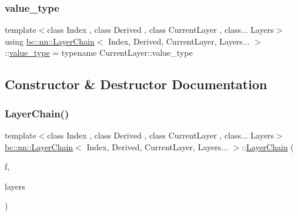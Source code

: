 \subsubsection{\texorpdfstring{value\+\_\+type}{value\_type}}
{\footnotesize\ttfamily template$<$class Index , class Derived , class Current\+Layer , class... Layers$>$ \\
using \hyperlink{structbc_1_1nn_1_1LayerChain}{bc\+::nn\+::\+Layer\+Chain}$<$ Index, Derived, Current\+Layer, Layers... $>$\+::\hyperlink{structbc_1_1nn_1_1LayerChain_3_01Index_00_01Derived_00_01CurrentLayer_00_01Layers_8_8_8_01_4_adbaa11a40f5d5c6c737b4f61cfd4dc1c}{value\+\_\+type} =  typename Current\+Layer\+::value\+\_\+type}



\subsection{Constructor \& Destructor Documentation}
\mbox{\label{structbc_1_1nn_1_1LayerChain_3_01Index_00_01Derived_00_01CurrentLayer_00_01Layers_8_8_8_01_4_a431c5798ec952b71784d60a312a8ff4b}} 
\subsubsection{\texorpdfstring{Layer\+Chain()}{LayerChain()}}
{\footnotesize\ttfamily template$<$class Index , class Derived , class Current\+Layer , class... Layers$>$ \\
\hyperlink{structbc_1_1nn_1_1LayerChain}{bc\+::nn\+::\+Layer\+Chain}$<$ Index, Derived, Current\+Layer, Layers... $>$\+::\hyperlink{structbc_1_1nn_1_1LayerChain}{Layer\+Chain} (\begin{DoxyParamCaption}\item[{Current\+Layer}]{f,  }\item[{Layers...}]{layers }\end{DoxyParamCaption})\hspace{0.3cm}{\ttfamily [inline]}}



